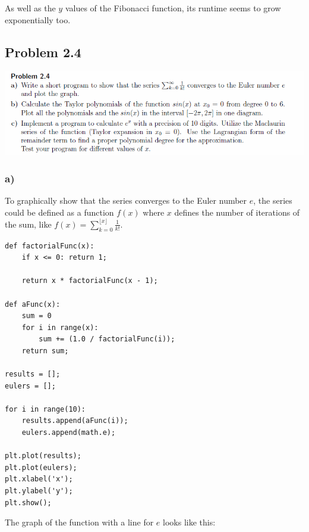 As well as the $y$ values of the Fibonacci function, its runtime seems to grow exponentially too.


\subsection{Problem 2.4}

\includegraphics[width=1\textwidth]{chapters/images/desc-2-4}


\subsubsection{a)}

To graphically show that the series converges to the Euler number $e$, the series could be defined as a function $f(x)$ where $x$ defines the number of iterations of the sum, like $f(x) = \sum_{k = 0}^{\lfloor x \rfloor} \frac{1}{k!}$.

\begin{lstlisting}[caption=Problem 2.4 a)]
def factorialFunc(x):
    if x <= 0: return 1;
	
    return x * factorialFunc(x - 1);

def aFunc(x):
	sum = 0
	for i in range(x):
		sum += (1.0 / factorialFunc(i));
	return sum;

results = [];
eulers = [];

for i in range(10):
	results.append(aFunc(i));
	eulers.append(math.e);

plt.plot(results);
plt.plot(eulers);
plt.xlabel('x');
plt.ylabel('y');
plt.show();
\end{lstlisting}

The graph of the function with a line for $e$ looks like this:

\newpage

